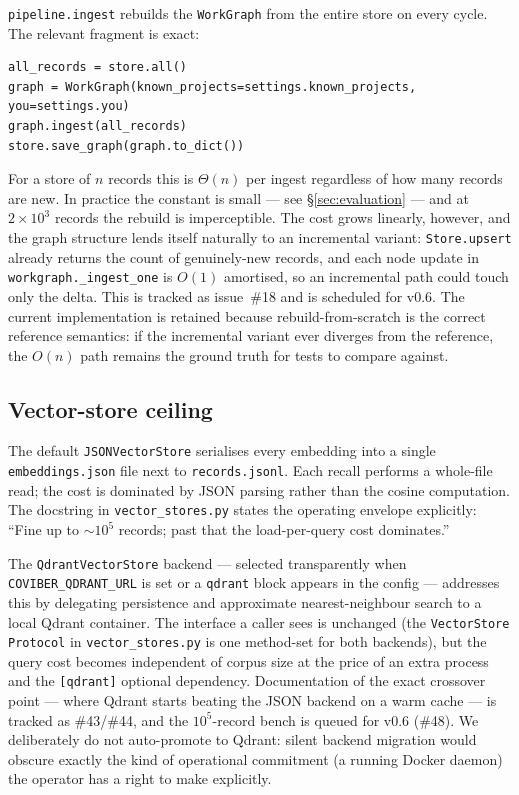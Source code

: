 \texttt{pipeline.ingest} rebuilds the \texttt{WorkGraph} from the entire store on every cycle. The relevant fragment is exact:

\begin{verbatim}
all_records = store.all()
graph = WorkGraph(known_projects=settings.known_projects, you=settings.you)
graph.ingest(all_records)
store.save_graph(graph.to_dict())
\end{verbatim}

For a store of $n$ records this is $\Theta(n)$ per ingest regardless of how many records are new. In practice the constant is small --- see \S\ref{sec:evaluation} --- and at $2\times10^3$ records the rebuild is imperceptible. The cost grows linearly, however, and the graph structure lends itself naturally to an incremental variant: \texttt{Store.upsert} already returns the count of genuinely-new records, and each node update in \texttt{workgraph.\_ingest\_one} is $O(1)$ amortised, so an incremental path could touch only the delta. This is tracked as issue~\#18 and is scheduled for v0.6. The current implementation is retained because rebuild-from-scratch is the correct reference semantics: if the incremental variant ever diverges from the reference, the $O(n)$ path remains the ground truth for tests to compare against.

\subsection{Vector-store ceiling}
\label{sec:limit-vector-ceiling}

The default \texttt{JSONVectorStore} serialises every embedding into a single \texttt{embeddings.json} file next to \texttt{records.jsonl}. Each recall performs a whole-file read; the cost is dominated by JSON parsing rather than the cosine computation. The docstring in \texttt{vector\_stores.py} states the operating envelope explicitly: ``Fine up to $\sim10^5$ records; past that the load-per-query cost dominates.''

The \texttt{QdrantVectorStore} backend --- selected transparently when \texttt{COVIBER\_QDRANT\_URL} is set or a \texttt{qdrant} block appears in the config --- addresses this by delegating persistence and approximate nearest-neighbour search to a local Qdrant container. The interface a caller sees is unchanged (the \texttt{VectorStore} \texttt{Protocol} in \texttt{vector\_stores.py} is one method-set for both backends), but the query cost becomes independent of corpus size at the price of an extra process and the \verb|[qdrant]| optional dependency. Documentation of the exact crossover point --- where Qdrant starts beating the JSON backend on a warm cache --- is tracked as \#43/\#44, and the $10^5$-record bench is queued for v0.6 (\#48). We deliberately do not auto-promote to Qdrant: silent backend migration would obscure exactly the kind of operational commitment (a running Docker daemon) the operator has a right to make explicitly.

